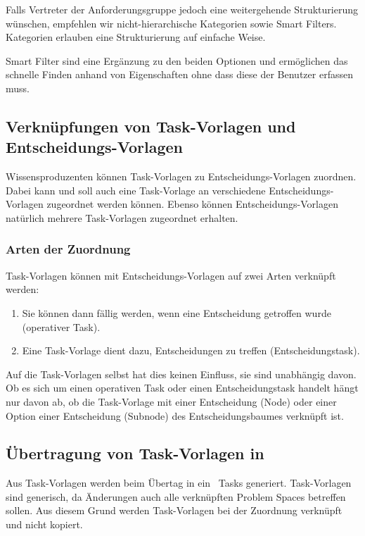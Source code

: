 {{				Falls Vertreter der Anforderungsgruppe jedoch eine weitergehende Strukturierung wünschen, 
				empfehlen wir nicht-hierarchische Kategorien sowie Smart Filters.
				Kategorien erlauben eine Strukturierung auf einfache Weise. 

				Smart Filter sind eine Ergänzung zu den beiden Optionen und ermöglichen das schnelle Finden anhand von Eigenschaften ohne dass diese der Benutzer erfassen muss.
			}
			{}
			{}
			{}
		}
		
		
		\subsection{Verknüpfungen von Task-Vorlagen und Entscheidungs-Vorlagen}
			Wissensproduzenten können Task-Vorlagen zu Entscheidungs-Vorlagen zuordnen.
			Dabei kann und soll auch eine Task-Vorlage an verschiedene Entscheidungs-Vorlagen zugeordnet werden können.
			Ebenso können Entscheidungs-Vorlagen natürlich mehrere Task-Vorlagen zugeordnet erhalten.
			
			\subsubsection{Arten der Zuordnung}
				Task-Vorlagen können mit Entscheidungs-Vorlagen auf zwei Arten verknüpft werden:
				\begin{enumerate}
					\item Sie können dann fällig werden, wenn eine Entscheidung getroffen wurde (operativer Task).
					\item Eine Task-Vorlage dient dazu, Entscheidungen zu treffen (Entscheidungstask).
				\end{enumerate}
				Auf die Task-Vorlagen selbst hat dies keinen Einfluss, sie sind unabhängig davon. 
				Ob es sich um einen operativen Task oder einen Entscheidungstask handelt hängt nur davon ab,
				ob die Task-Vorlage mit einer Entscheidung (Node) oder einer Option einer Entscheidung (Subnode) des Entscheidungsbaumes verknüpft ist.

			\subsection{Übertragung von Task-Vorlagen in \ppt}
				Aus Task-Vorlagen werden beim Übertag in ein \ppt\ Tasks generiert.
				Task-Vorlagen sind generisch, da Änderungen auch alle verknüpften Problem Spaces betreffen sollen.
				Aus diesem Grund werden Task-Vorlagen bei der Zuordnung verknüpft und nicht kopiert.
				
